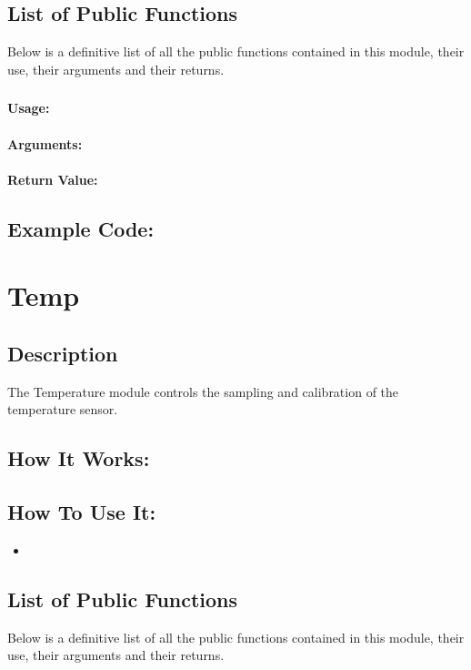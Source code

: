 \documentclass[]{report}
\begin{document}
\section{List of Public Functions}
Below is a definitive list of all the public functions contained in this module, their use, their arguments and their returns.

\subsection{}
\subsubsection{Usage:}

\subsubsection{Arguments:}

\subsubsection{Return Value:}

\section{Example Code:}


\chapter{Temp}
\section{Description}
The Temperature module controls the sampling and calibration of the temperature sensor.

\section{How It Works:}

\section{How To Use It:}
\begin{itemize}
	\item 
\end{itemize}

\section{List of Public Functions}
Below is a definitive list of all the public functions contained in this module, their use, their arguments and their returns.
\end{document}

